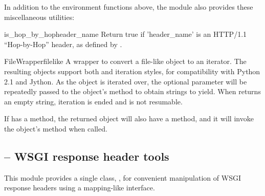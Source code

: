 In addition to the environment functions above, the
 module also provides these miscellaneous
utilities:

\begin{funcdesc}{is_hop_by_hop}{header_name}
Return true if 'header_name' is an HTTP/1.1 ``Hop-by-Hop'' header, as
defined by .
\end{funcdesc}

\begin{classdesc}{FileWrapper}{filelike }
A wrapper to convert a file-like object to an iterator.  The resulting
objects support both  and 
iteration styles, for compatibility with Python 2.1 and Jython.
As the object is iterated over, the optional  parameter
will be repeatedly passed to the  object's 
method to obtain strings to yield.  When  returns an
empty string, iteration is ended and is not resumable.

If  has a  method, the returned object
will also have a  method, and it will invoke the
 object's  method when called.
\end{classdesc}



















\subsection{ -- WSGI response header tools}

This module provides a single class, , for convenient
manipulation of WSGI response headers using a mapping-like interface.

